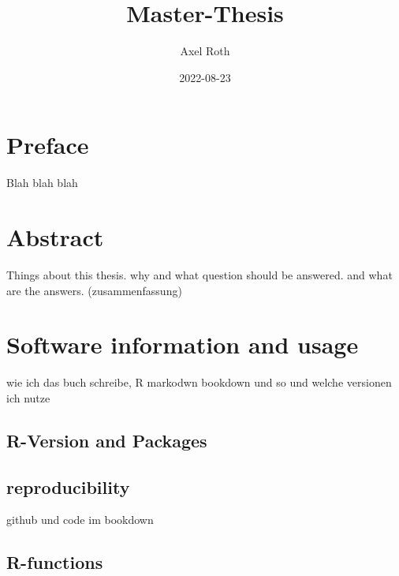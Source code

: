\documentclass[
  oneside]{book}
\title{Master-Thesis}
\author{Axel Roth}
\date{2022-08-23}
\begin{document}
\maketitle

{
\setcounter{tocdepth}{1}
\tableofcontents
}
\hypertarget{preface}{%
\chapter*{Preface}\label{preface}}

\renewcommand{\chaptermark}[1]{\markboth{\uppercase{#1}}{\uppercase{#1}}}

Blah blah blah

\renewcommand{\chaptermark}[1]{\markboth{\uppercase{\thechapter. \ #1}}{}}

\hypertarget{abstract}{%
\chapter{Abstract}\label{abstract}}

Things about this thesis. why and what question should be answered. and what are the answers. (zusammenfassung)

\hypertarget{software-information-and-usage}{%
\chapter{Software information and usage}\label{software-information-and-usage}}

wie ich das buch schreibe, R markodwn bookdown und so und welche versionen ich nutze

\hypertarget{r-version-and-packages}{%
\section{R-Version and Packages}\label{r-version-and-packages}}

\hypertarget{reproducibility}{%
\section{reproducibility}\label{reproducibility}}

github und code im bookdown

\hypertarget{r-functions}{%
\section{R-functions}\label{r-functions}}
\end{document}
